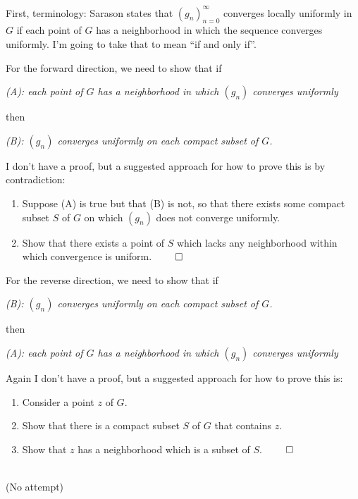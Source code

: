 \documentclass[12pt]{article}
\begin{document}
\begin{description}

  \\\\
  First, terminology: Sarason states that $(g_n)_{n=0}^\infty$ converges
  locally uniformly in $G$ if each point of $G$ has a neighborhood in which the
  sequence converges uniformly. I'm going to take that to mean ``if and only if''.

  For the forward direction, we need to show that if

  \emph{(A): each point of $G$ has a neighborhood in which $(g_n)$ converges uniformly}

  then

  \emph{(B): $(g_n)$ converges uniformly on each compact subset of $G$.}

  I don't have a proof, but a suggested approach for how to prove this is by contradiction:
  \begin{enumerate}
  \item Suppose (A) is true but that (B) is not, so that there exists some
    compact subset $S$ of $G$ on which $(g_n)$ does not converge uniformly.
  \item Show that there exists a point of $S$ which lacks any neighborhood
    within which convergence is uniform. $\qed$
  \end{enumerate}

  For the reverse direction, we need to show that if

  \emph{(B): $(g_n)$ converges uniformly on each compact subset of $G$.}

  then

  \emph{(A): each point of $G$ has a neighborhood in which $(g_n)$ converges uniformly}

  Again I don't have a proof, but a suggested approach for how to prove this is:
  \begin{enumerate}
  \item Consider a point $z$ of $G$.
  \item Show that there is a compact subset $S$ of $G$ that contains $z$.
  \item Show that $z$ has a neighborhood which is a subset of $S$. $\qed$
  \end{enumerate}

\\
(No attempt)


\end{description}
\end{document}
